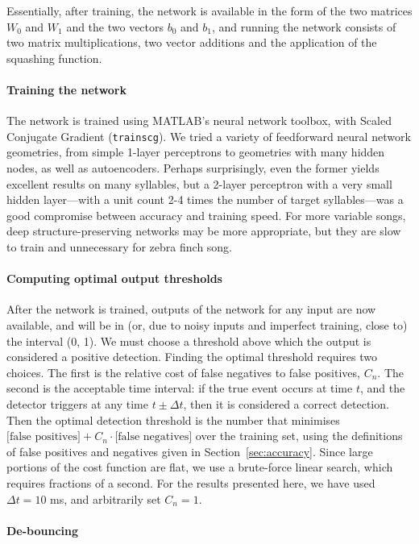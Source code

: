 \documentclass[10pt,letterpaper]{article}
\renewcommand{\subsubsection}[1]{\paragraph{#1}}
\begin{document}
Essentially, after training, the network is available in the form of
the two matrices $W_0$ and $W_1$ and the two vectors $b_0$ and $b_1$,
and running the network consists of two matrix multiplications, two
vector additions and the application of the squashing function.

\subsubsection{Training the network}

The network is trained using MATLAB's neural network toolbox, with
Scaled Conjugate Gradient ({\tt trainscg}). We tried a variety of
feedforward neural network geometries, from simple 1-layer perceptrons
to geometries with many hidden nodes, as well as autoencoders. Perhaps
surprisingly, even the former yields excellent results on many
syllables, but a 2-layer perceptron with a very small hidden
layer---with a unit count 2-4 times the number of target
syllables---was a good compromise between accuracy and training
speed. For more variable songs, deep structure-preserving networks may
be more appropriate, but they are slow to train and unnecessary for
zebra finch song.

\subsubsection{Computing optimal output thresholds}
\label{sec:optimalthresholds}
After the network is trained, outputs of the network for any input are
now available, and will be in (or, due to noisy inputs and imperfect
training, close to) the interval (0, 1). We must choose a threshold
above which the output is considered a positive detection. Finding the
optimal threshold requires two choices. The first is the relative cost
of false negatives to false positives, $C_n$. The second is the
acceptable time interval: if the true event occurs at time $t$, and
the detector triggers at any time $t\pm\Delta t$, then it is
considered a correct detection. Then the optimal detection threshold
is the number that minimises $\textrm{[false positives]}
+C_n\cdot\textrm{[false negatives]}$ over the training set, using the
definitions of false positives and negatives given in
Section~\ref{sec:accuracy}. Since large portions of the cost function
are flat, we use a brute-force linear search, which requires fractions of a
second. For the results presented here, we have used
$\Delta t=10$ ms, and arbitrarily set $C_n=1$.

\subsubsection{De-bouncing}
\end{document}
